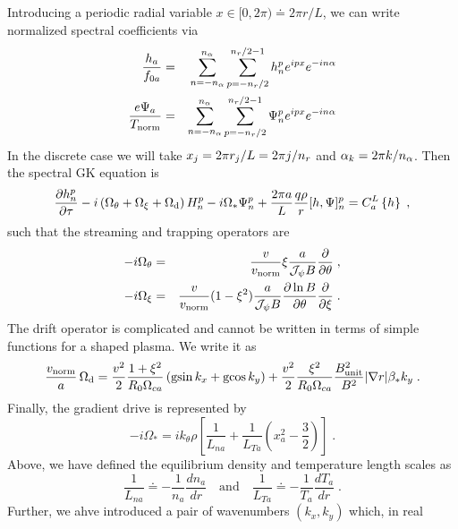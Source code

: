 \documentclass[11pt]{article}
\begin{document}
Introducing a periodic radial variable $x \in [0,2\pi) \doteq 2 \pi r/L$, we can 
write normalized spectral coefficients via
%
\begin{eqnarray}
\frac{h_a}{f_{0a}} & = & \sum_{n=-n_\alpha}^{n_\alpha} 
                    \sum_{p=-n_r/2}^{n_r/2-1} h_n^p e^{ipx} e^{-in\alpha} \\
\frac{e \Psi_a}{T_{\rm norm}} & = &  \sum_{n=-n_\alpha}^{n_\alpha} 
                    \sum_{p=-n_r/2}^{n_r/2-1} \Psi_n^p e^{ipx} e^{-in\alpha} 
\end{eqnarray}
%
In the discrete case we will take $x_j = 2\pi r_j/L = 2\pi j/n_r$ 
and $\alpha_k = 2\pi k/n_\alpha$.  Then the spectral GK equation is
%
\begin{equation}
\frac{\partial h_n^p}{\partial \tau}
- i \left( \Omega_{\theta} + \Omega_{\rm \xi} + \Omega_{\rm d} \right) H_n^p
  - i \Omega_* \Psi_n^p + \frac{2\pi a}{L} \frac{q \rho}{r}
   [h,\Psi]_n^p = C_a^{L}\left\{h\right\} \; ,
\label{ngkeqn}
\end{equation}
%
such that the streaming and trapping operators are
%
\begin{eqnarray}
-i \Omega_{\theta} &=& \frac{v}{v_{\rm norm}} \xi \frac{a}{{\cal J}_\psi B}  
\frac{\partial}{\partial \theta} \; , \\
-i \Omega_{\xi} &=& \frac{v}{v_{\rm norm}} (1-\xi^2)
\frac{a}{{\cal J}_\psi B} \frac{\partial \ln B}{\partial \theta}
  \frac{\partial}{\partial \xi} \; .
\end{eqnarray}
%
The drift operator is complicated and cannot be written in terms of simple 
functions for a shaped plasma.  We write it as
%
\begin{equation}
\frac{v_{\rm norm}}{a} \, \Omega_{\rm d} =  
 \frac{v^2}{2} \frac{1 + \xi^2}{R_0 \Omega_{ca}} \left( 
  {\rm gsin} \, k_x + {\rm gcos} \, k_y \right) 
 + \frac{v^2}{2} \frac{\xi^2}{R_0 \Omega_{ca}} 
\frac{B_{\rm unit}^2}{B^2} |\nabla r| \beta_* k_y \; .
\end{equation}
%
Finally, the gradient drive is represented by
\begin{equation}
- i \Omega_{*} = i k_{\theta} \rho \left[ \frac{1}{L_{na}} + \frac{1}{L_{Ta}}
\left( x_a^2 - \frac{3}{2} \right) \right] \; .
\end{equation}
%
Above, we have defined the equilibrium density and temperature length 
scales as
% 
\begin{equation}
\frac{1}{L_{na}}\doteq -\frac{1}{n_a}\frac{d n_a}{dr} 
\quad\mathrm{and}\quad
\frac{1}{L_{Ta}} \doteq -\frac{1}{T_a}\frac{d T_a}{dr} \; .
\end{equation} 
%
Further, we ahve introduced a pair of wavenumbers $(k_x,k_y)$  which, in real 
\end{document}
